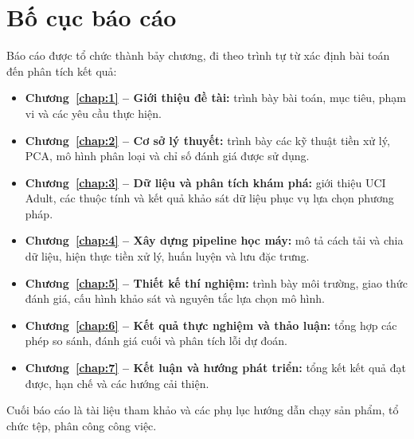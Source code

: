 \section{Bố cục báo cáo}
\label{sec:1_5}
Báo cáo được tổ chức thành bảy chương, đi theo trình tự từ xác định bài toán đến phân tích kết quả:

\begin{itemize}
  \item \textbf{Chương~\ref{chap:1} -- Giới thiệu đề tài:} trình bày bài toán, mục tiêu, phạm vi và các yêu cầu thực hiện.
  \item \textbf{Chương~\ref{chap:2} -- Cơ sở lý thuyết:} trình bày các kỹ thuật tiền xử lý, PCA, mô hình phân loại và chỉ số đánh giá được sử dụng.
  \item \textbf{Chương~\ref{chap:3} -- Dữ liệu và phân tích khám phá:} giới thiệu UCI Adult, các thuộc tính và kết quả khảo sát dữ liệu phục vụ lựa chọn phương pháp.
  \item \textbf{Chương~\ref{chap:4} -- Xây dựng pipeline học máy:} mô tả cách tải và chia dữ liệu, hiện thực tiền xử lý, huấn luyện và lưu đặc trưng.
  \item \textbf{Chương~\ref{chap:5} -- Thiết kế thí nghiệm:} trình bày môi trường, giao thức đánh giá, cấu hình khảo sát và nguyên tắc lựa chọn mô hình.
  \item \textbf{Chương~\ref{chap:6} -- Kết quả thực nghiệm và thảo luận:} tổng hợp các phép so sánh, đánh giá cuối và phân tích lỗi dự đoán.
  \item \textbf{Chương~\ref{chap:7} -- Kết luận và hướng phát triển:} tổng kết kết quả đạt được, hạn chế và các hướng cải thiện.
\end{itemize}

Cuối báo cáo là tài liệu tham khảo và các phụ lục hướng dẫn chạy sản phẩm, tổ chức tệp, phân công công việc.
